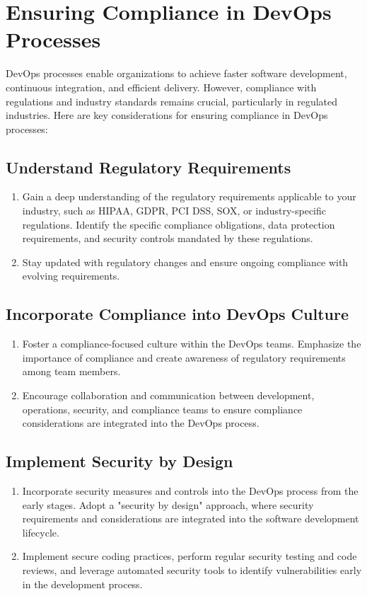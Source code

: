 \chapter{Ensuring Compliance in DevOps Processes}

DevOps processes enable organizations to achieve faster software development, continuous integration, and efficient delivery. However, compliance with regulations and industry standards remains crucial, particularly in regulated industries. Here are key considerations for ensuring compliance in DevOps processes:

\section*{Understand Regulatory Requirements}
\begin{enumerate}
    \item Gain a deep understanding of the regulatory requirements applicable to your industry, such as HIPAA, GDPR, PCI DSS, SOX, or industry-specific regulations. Identify the specific compliance obligations, data protection requirements, and security controls mandated by these regulations.

    \item Stay updated with regulatory changes and ensure ongoing compliance with evolving requirements.
\end{enumerate}

\section*{Incorporate Compliance into DevOps Culture}
\begin{enumerate}
    \item Foster a compliance-focused culture within the DevOps teams. Emphasize the importance of compliance and create awareness of regulatory requirements among team members.

    \item Encourage collaboration and communication between development, operations, security, and compliance teams to ensure compliance considerations are integrated into the DevOps process.
\end{enumerate}

\section*{Implement Security by Design}
\begin{enumerate}
    \item Incorporate security measures and controls into the DevOps process from the early stages. Adopt a "security by design" approach, where security requirements and considerations are integrated into the software development lifecycle.

    \item Implement secure coding practices, perform regular security testing and code reviews, and leverage automated security tools to identify vulnerabilities early in the development process.
\end{enumerate}


